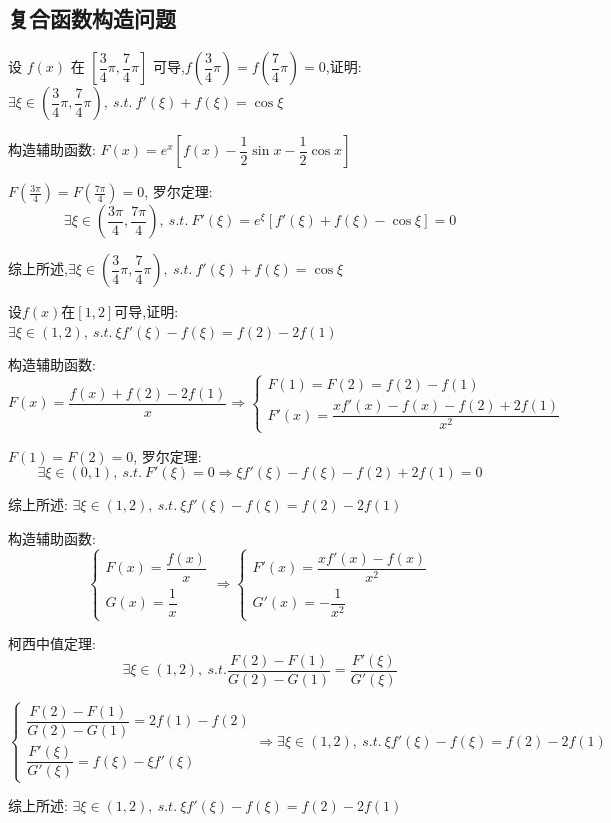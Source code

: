 \subsection{复合函数构造问题}
\begin{proposition}
	设 $f(x)$ 在 $[\dfrac{3}{4}\pi,\dfrac{7}{4}\pi]$ 可导,$f(\dfrac{3}{4}\pi)=f(\dfrac{7}{4}\pi)=0$,证明: 
	$\exists \xi\in(\dfrac{3}{4}\pi,\dfrac{7}{4}\pi),\ s.t.\ f'(\xi)+f(\xi)=\cos \xi$
\end{proposition}
\begin{solution}

	构造辅助函数: $F(x)=e^x\left[f(x)-\dfrac{1}{2}\sin x-\dfrac{1}{2}\cos x\right]$

	$F(\frac{3\pi}{4})=F(\frac{7\pi}{4})=0$, 罗尔定理:
	$$\exists \xi\in(\frac{3\pi}{4},\frac{7\pi}{4}),\ s.t.\ F'(\xi)=e^{\xi}\left[f'(\xi)+f(\xi)-\cos \xi\right]=0$$

	综上所述,$\exists \xi\in(\dfrac{3}{4}\pi,\dfrac{7}{4}\pi),\ s.t.\ f'(\xi)+f(\xi)=\cos \xi$
\end{solution}

\begin{proposition}
	设$f(x)$在$[1,2]$可导,证明: $\exists \xi\in(1,2),\ s.t.\ \xi f'(\xi)-f(\xi)=f(2)-2f(1)$
\end{proposition}
\begin{solution}

	构造辅助函数: 
	$$F(x)=\dfrac{f(x)+f(2)-2f(1)}{x}\Rightarrow \begin{cases}
		F(1) = F(2) = f(2)-f(1)\\
		F'(x) = \dfrac{xf'(x)-f(x)-f(2)+2f(1)}{x^2}
	\end{cases}$$

	$F(1) = F(2) = 0$, 罗尔定理:
	$$\exists\xi\in(0,1),\ s.t.\ F'(\xi)=0\Rightarrow \xi f'(\xi)-f(\xi)-f(2)+2f(1)=0$$

	综上所述: $\exists \xi\in(1,2),\ s.t.\ \xi f'(\xi)-f(\xi)=f(2)-2f(1)$
\end{solution}
\begin{anymark}[柯西中值定理]
	构造辅助函数:
	$$\begin{cases}
		F(x)=\dfrac{f(x)}{x}\\
		G(x)=\dfrac{1}{x}
	\end{cases}\Rightarrow
	\begin{cases}
		F'(x)=\dfrac{xf'(x)-f(x)}{x^2}\\
		G'(x)=-\dfrac{1}{x^2}
	\end{cases}$$


	柯西中值定理:
	$$\exists\xi\in(1,2),\ s.t.\dfrac{F(2)-F(1)}{G(2)-G(1)}=\dfrac{F'(\xi)}{G'(\xi)}$$

	$$\begin{cases}
		\dfrac{F(2)-F(1)}{G(2)-G(1)}=2f(1)-f(2) \\
		\dfrac{F'(\xi)}{G'(\xi)}=f(\xi)-\xi f'(\xi)
	\end{cases}\Rightarrow \exists \xi\in(1,2),\ s.t.\ \xi f'(\xi)-f(\xi)=f(2)-2f(1)$$

	综上所述: $\exists \xi\in(1,2),\ s.t.\ \xi f'(\xi)-f(\xi)=f(2)-2f(1)$
\end{anymark}

